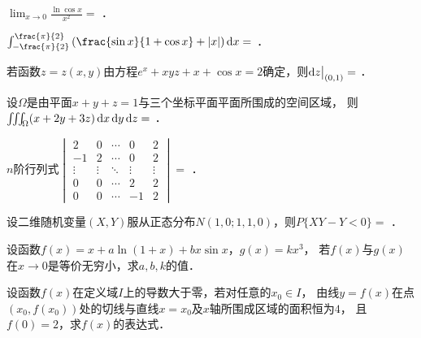 \documentclass[plain,noanswer,medmath]{../../template/jnuexam}
\begin{document}


\begin{problem}
$\lim_{x \to 0} \frac{\ln \cos x}{x^2} =$ \fillin{}．
\end{problem}


\begin{problem}
$\int_{-\frac{\pi}{2}}^{\frac{\pi}{2}} \left(\frac{\sin x}{1+\cos x} + |x|\right)\dx =$ \fillin{}．
\end{problem}


\begin{problem}
若函数$z = z(x,y)$由方程$e^x + xyz + x + \cos x = 2$确定，则$\mathop{}\!\mathrm{d} z\big|_{(0,1)} =$ \fillin{}．
\end{problem}


\begin{problem}
设$\Omega$是由平面$x + y + z = 1$与三个坐标平面平面所围成的空间区域，\goodbreak
则$\iiint_{\Omega}(x + 2y + 3z)\mathop{}\!\mathrm{d} x\mathop{}\!\mathrm{d} y\mathop{}\!\mathrm{d} z =$ \fillin{}．
\end{problem}


\begin{problem}
$n$阶行列式$\begin{vmatrix}
       2 &      0 & \cdots &      0 & 2 \\
      -1 &      2 & \cdots &      0 & 2 \\
  \vdots & \vdots & \ddots & \vdots & \vdots \\
       0 &      0 & \cdots &      2 & 2 \\
       0 &      0 & \cdots &     -1 & 2
\end{vmatrix} =$ \fillin{}．
\end{problem}


\begin{problem}
设二维随机变量$(X,Y)$服从正态分布$N(1,0;1,1,0)$，则$P\{XY - Y < 0\} =$ \fillin{}．
\end{problem}




\begin{problem}[points=10]
设函数$f(x) = x + a\ln(1 + x) + bx\sin x$，$g(x) = kx^3$，
若$f(x)$与$g(x)$在$x \to 0$是等价无穷小，求$a,b,k$的值．
\end{problem}


\begin{problem}[points=10]
设函数$f(x)$在定义域$I$上的导数大于零，若对任意的$x_0 \in I$，
由线$y = f(x)$在点$\left(x_0,f(x_0)\right)$处的切线与直线$x = x_0$及$x$轴所围成区域的面积恒为$4$，
且$f(0) = 2$，求$f(x)$的表达式．
\end{problem}
\end{document}
